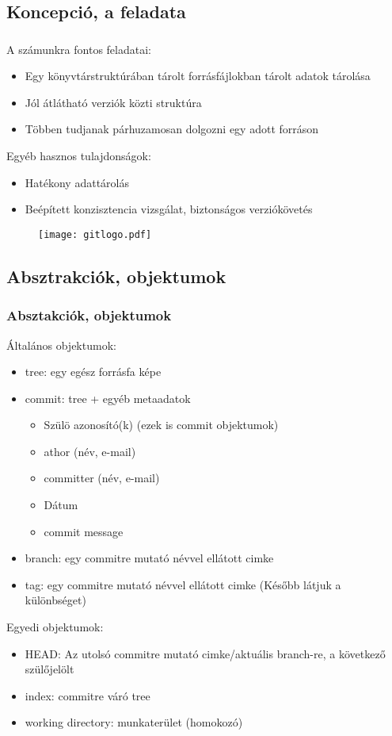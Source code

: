 	\subsection{Koncepció, a \git feladata}
	\begin{frame}
	  \frametitle{\git}
	  A \git számunkra fontos feladatai:
	  \begin{itemize}
	    \item{Egy könyvtárstruktúrában tárolt forrásfájlokban tárolt adatok tárolása}
	    \item{Jól átlátható verziók közti struktúra}
	    \item{Többen tudjanak párhuzamosan dolgozni egy adott forráson}
	  \end{itemize}
	  Egyéb hasznos tulajdonságok:
	  \begin{itemize}
	    \item{Hatékony adattárolás}
	    \item{Beépített konzisztencia vizsgálat, biztonságos verziókövetés}
	  \end{itemize}
	  \begin{figure}
	    \centering
	    \texttt{[image: gitlogo.pdf]}
	  \end{figure}
	\end{frame}
	\subsection{Absztrakciók, objektumok}
	\begin{frame}
	  \frametitle{Absztakciók, objektumok}
	  Általános objektumok:
	  \begin{itemize}
	    \item{tree: egy egész forrásfa képe}
	    \item{commit: tree + egyéb metaadatok}
	      \begin{itemize}
		\item{Szülö azonosító(k) (ezek is commit objektumok)}
		\item{athor (név, e-mail)}
		\item{committer (név, e-mail)}
		\item{Dátum}
		\item{commit message}
	      \end{itemize}
	    \item{branch: egy commitre mutató névvel ellátott cimke}
	    \item{tag: egy commitre mutató névvel ellátott cimke (Később látjuk a különbséget)}
	  \end{itemize}
	  Egyedi objektumok:
	  \begin{itemize}
	    \item{HEAD: Az utolsó commitre mutató cimke/aktuális branch-re, a következő szülőjelölt}
	    \item{index: commitre váró tree}
	    \item{working directory: munkaterület (homokozó)}
	  \end{itemize}
	\end{frame}
